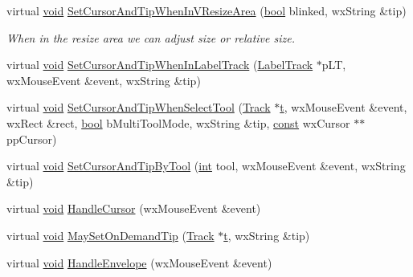 \begin{DoxyCompactItemize}
\item 
virtual \hyperlink{sound_8c_ae35f5844602719cf66324f4de2a658b3}{void} \hyperlink{class_track_panel_a58ff067a7bd41439d1315d231926d739}{Set\+Cursor\+And\+Tip\+When\+In\+V\+Resize\+Area} (\hyperlink{mac_2config_2i386_2lib-src_2libsoxr_2soxr-config_8h_abb452686968e48b67397da5f97445f5b}{bool} blinked, wx\+String \&tip)
\begin{DoxyCompactList}\small\item\em When in the resize area we can adjust size or relative size. \end{DoxyCompactList}\item 
virtual \hyperlink{sound_8c_ae35f5844602719cf66324f4de2a658b3}{void} \hyperlink{class_track_panel_a9c9a5efbb00766367f6d04675b04194e}{Set\+Cursor\+And\+Tip\+When\+In\+Label\+Track} (\hyperlink{class_label_track}{Label\+Track} $\ast$p\+LT, wx\+Mouse\+Event \&event, wx\+String \&tip)
\item 
virtual \hyperlink{sound_8c_ae35f5844602719cf66324f4de2a658b3}{void} \hyperlink{class_track_panel_aeba082d58c890da9c7f43c201a72b411}{Set\+Cursor\+And\+Tip\+When\+Select\+Tool} (\hyperlink{class_track}{Track} $\ast$\hyperlink{octave__test_8m_aaccc9105df5383111407fd5b41255e23}{t}, wx\+Mouse\+Event \&event, wx\+Rect \&rect, \hyperlink{mac_2config_2i386_2lib-src_2libsoxr_2soxr-config_8h_abb452686968e48b67397da5f97445f5b}{bool} b\+Multi\+Tool\+Mode, wx\+String \&tip, \hyperlink{getopt1_8c_a2c212835823e3c54a8ab6d95c652660e}{const} wx\+Cursor $\ast$$\ast$pp\+Cursor)
\item 
virtual \hyperlink{sound_8c_ae35f5844602719cf66324f4de2a658b3}{void} \hyperlink{class_track_panel_a8182c520cbff18464a755ae8ee69ee29}{Set\+Cursor\+And\+Tip\+By\+Tool} (\hyperlink{xmltok_8h_a5a0d4a5641ce434f1d23533f2b2e6653}{int} tool, wx\+Mouse\+Event \&event, wx\+String \&tip)
\item 
virtual \hyperlink{sound_8c_ae35f5844602719cf66324f4de2a658b3}{void} \hyperlink{class_track_panel_a8e65fa01f46106d180a1fc99fd20dabd}{Handle\+Cursor} (wx\+Mouse\+Event \&event)
\item 
virtual \hyperlink{sound_8c_ae35f5844602719cf66324f4de2a658b3}{void} \hyperlink{class_track_panel_a5f33eeac1ae61a62b09aacf9d9f7e928}{May\+Set\+On\+Demand\+Tip} (\hyperlink{class_track}{Track} $\ast$\hyperlink{octave__test_8m_aaccc9105df5383111407fd5b41255e23}{t}, wx\+String \&tip)
\item 
virtual \hyperlink{sound_8c_ae35f5844602719cf66324f4de2a658b3}{void} \hyperlink{class_track_panel_ac1edb4292cfaec717846b6c880bdf4e6}{Handle\+Envelope} (wx\+Mouse\+Event \&event)
$$
\end{DoxyCompactItemize}
